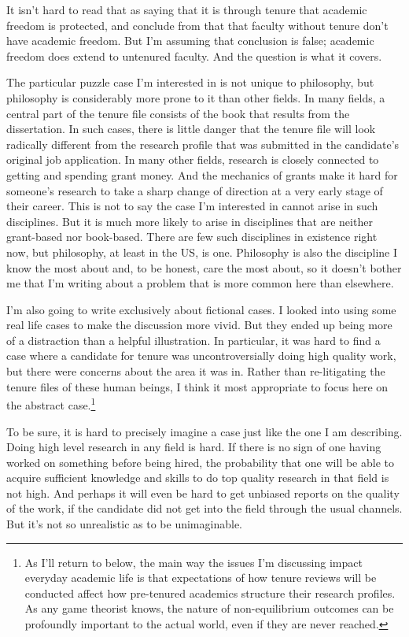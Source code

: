 \documentclass[
  10pt,
  letterpaper,
  DIV=11,
  numbers=noendperiod,
  twoside]{scrartcl}
\begin{document}
It isn't hard to read that as saying that it is through tenure that
academic freedom is protected, and conclude from that that faculty
without tenure don't have academic freedom. But I'm assuming that
conclusion is false; academic freedom does extend to untenured faculty.
And the question is what it covers.

The particular puzzle case I'm interested in is not unique to
philosophy, but philosophy is considerably more prone to it than other
fields. In many fields, a central part of the tenure file consists of
the book that results from the dissertation. In such cases, there is
little danger that the tenure file will look radically different from
the research profile that was submitted in the candidate's original job
application. In many other fields, research is closely connected to
getting and spending grant money. And the mechanics of grants make it
hard for someone's research to take a sharp change of direction at a
very early stage of their career. This is not to say the case I'm
interested in cannot arise in such disciplines. But it is much more
likely to arise in disciplines that are neither grant-based nor
book-based. There are few such disciplines in existence right now, but
philosophy, at least in the US, is one. Philosophy is also the
discipline I know the most about and, to be honest, care the most about,
so it doesn't bother me that I'm writing about a problem that is more
common here than elsewhere.

I'm also going to write exclusively about fictional cases. I looked into
using some real life cases to make the discussion more vivid. But they
ended up being more of a distraction than a helpful illustration. In
particular, it was hard to find a case where a candidate for tenure was
uncontroversially doing high quality work, but there were concerns about
the area it was in. Rather than re-litigating the tenure files of these
human beings, I think it most appropriate to focus here on the abstract
case.\footnote{As I'll return to below, the main way the issues I'm
  discussing impact everyday academic life is that expectations of how
  tenure reviews will be conducted affect how pre-tenured academics
  structure their research profiles. As any game theorist knows, the
  nature of non-equilibrium outcomes can be profoundly important to the
  actual world, even if they are never reached.}

To be sure, it is hard to precisely imagine a case just like the one I
am describing. Doing high level research in any field is hard. If there
is no sign of one having worked on something before being hired, the
probability that one will be able to acquire sufficient knowledge and
skills to do top quality research in that field is not high. And perhaps
it will even be hard to get unbiased reports on the quality of the work,
if the candidate did not get into the field through the usual channels.
But it's not so unrealistic as to be unimaginable.
\end{document}
